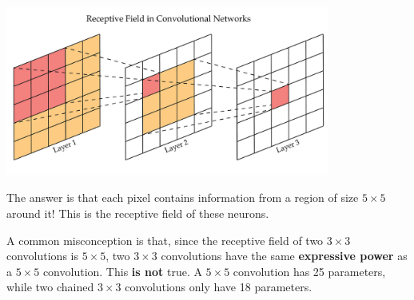 \begin{center}
\includegraphics[width=0.8\textwidth]{figuras/receptive_field.png}
\end{center}

The answer is that each pixel contains information from a region of size \( 5 \times 5 \) around it! This is the receptive field of these neurons.

A common misconception is that, since the receptive field of two \( 3 \times 3 \) convolutions is \( 5 \times 5 \), two \( 3 \times 3 \) convolutions have the same \textbf{expressive power} as a \( 5 \times 5 \) convolution. This \textbf{is not} true. A \( 5 \times 5 \) convolution has 25 parameters, while two chained \( 3 \times 3 \) convolutions only have 18 parameters.





